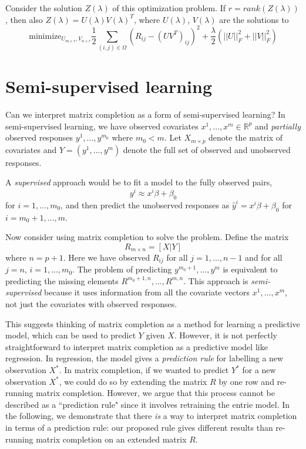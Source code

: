 \documentclass[11pt]{article}
\begin{document}
Consider the solution $Z(\lambda)$ of this optimization problem.  If $r =
rank(Z(\lambda))$, then also $Z(\lambda) = U(\lambda)V(\lambda)^T$, where $U(\lambda)$, $V(\lambda)$ are the solutions to
$$
\text{minimize}_{U_{m\times r}, V_{n \times r}} \frac{1}{2} \sum_{(i, j) \in \Omega} (R_{ij} - (UV^T)_{ij})^2 + \frac{\lambda}{2}(||U||^2_F + ||V||^2_F)
$$

\section{Semi-supervised learning}

Can we interpret matrix completion as a form of semi-supervised
learning?  In semi-supervised learning, we have observed covariates
$x^1, ... , x^m \in \mathbb{R}^p$ and \emph{partially} observed responses
$y^1, ..., y^{m_0}$ where $m_0 < m$.  Let $X_{m \times p}$ denote the
matrix of covariates and $Y = (y^1, ... , y^m)$ denote the full set of
observed and unobserved responses.

A \emph{supervised} approach would be to fit a model to the fully
observed pairs,
$$ y^i \approx x^i \beta + \beta_0 $$
for $i = 1,..., m_0$,
and then predict the unobserved responses as
$\hat{y}^i = x^i \beta + \beta_0$ for $i = m_0 + 1, ... , m$.

Now consider using matrix completion to solve the problem.  Define the
matrix $$R_{m \times n} = [X | Y]$$ where $n = p+1$.  Here we have
observed $R_{ij}$ for all $j = 1, ... , n-1$ and for all $j = n$, $i =
1, ..., m_0$.  The problem of predicting $y^{m_0 + 1},..., y^m$ is
equivalent to predicting the missing elements $R^{m_0 + 1, n}, ...,
R^{m, n}$.  This approach is \emph{semi-supervised} because it uses
information from all the covariate vectors $x^1,\hdots, x^m$, not just
the covariates with observed responses.

This suggests thinking of matrix completion as a method for learning a
predictive model, which can be used to predict $Y$ given $X$.
However, it is not perfectly straightforward to interpret matrix
completion as a predictive model like regression.  In regression, the
model gives a \emph{prediction rule} for labelling a new observation
$X^*$.  In matrix completion, if we wanted to predict $Y^*$ for a new
observation $X^*$, we could do so by extending the matrix $R$ by one
row and re-running matrix completion.  However, we argue that this
process cannot be described as a ``prediction rule" since it involves
retraining the entrie model. In the following, we demonstrate that
there \emph{is} a way to interpret matrix completion in terms of a
prediction rule: our proposed rule gives different results than
re-running matrix completion on an extended matrix $R$.
\end{document}
